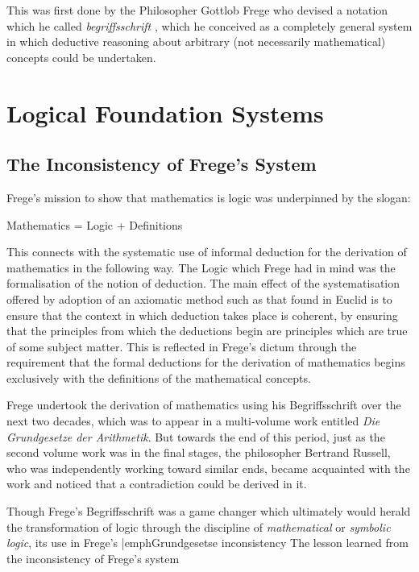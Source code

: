 \documentclass[10pt,titlepage]{book}
\begin{document}
This was first done by the Philosopher Gottlob Frege who devised a notation which he called \emph{begriffsschrift} \cite{Frege79}, which he conceived as a completely general system in which deductive reasoning about arbitrary (not necessarily mathematical) concepts could be undertaken.

\chapter{Logical Foundation Systems}\label{ChapLFS}

\section{The Inconsistency of Frege's System}

Frege's mission to show that mathematics is logic was underpinned by the slogan:

\begin{centering}
Mathematics = Logic + Definitions
\end{centering}

This connects with the systematic use of informal deduction for the derivation of mathematics in the following way.
The Logic which Frege had in mind was the formalisation of the notion of deduction.
The main effect of the systematisation offered by adoption of an axiomatic method such as that found in Euclid is to ensure that the context in which deduction takes place is coherent, by ensuring that the principles from which the deductions begin are principles which are true of some subject matter.
This is reflected in Frege's dictum through the requirement that the formal deductions for the derivation of mathematics begins exclusively with the definitions of the mathematical concepts.

Frege undertook the derivation of mathematics using his Begriffsschrift over the next two decades, which was to appear in a multi-volume work entitled \emph{Die Grundgesetze der Arithmetik}\cite{frege93}.
But towards the end of this period, just as the second volume work was in the final stages, the philosopher Bertrand Russell, who was independently working toward similar ends, became acquainted with the work and noticed that a contradiction could be derived in it.

Though Frege's Begriffsschrift was a game changer which ultimately would herald the transformation of logic through the discipline of \emph{mathematical} or \emph{symbolic logic}, its use in Frege's |emph{Grundgesetse} inconsistency 
The lesson learned from the inconsistency of Frege's system
\end{document}

